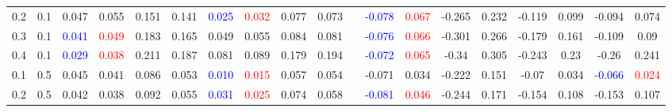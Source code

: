 \documentclass[specialist,
substylefile = spbu_report.rtx,
subf,12pt]{disser}
\theoremstyle{definition}
\begin{document}
\begin{table}
{\begin{tabular}{m{1cm}m{1cm}ccccccccm{0.2cm}cccccccc}
			0.2 & 0.1    & 0.047                                   & 0.055                                      & 0.151                               & 0.141                       & \textcolor{blue}{0.025} & \textcolor{red}{0.032}                  & 0.077                                      & 0.073                    &                             & \textcolor{blue}{-0.078} & \textcolor{red}{0.067} & -0.265                   & 0.232      & -0.119                   & 0.099                   & -0.094                   & 0.074                  \\
			0.3 & 0.1    & \textcolor{blue}{0.041}                 & \textcolor{red}{0.049}                     & 0.183                               & 0.165                       & 0.049                   & 0.055                                   & 0.084                                      & 0.081                    &                             & \textcolor{blue}{-0.076} & \textcolor{red}{0.066} & -0.301                   & 0.266      & -0.179                   & 0.161                   & -0.109                   & 0.09                   \\
			0.4 & 0.1    & \textcolor{blue}{0.029}                 & \textcolor{red}{0.038}                     & 0.211                               & 0.187                       & 0.081                   & 0.089                                   & 0.179                                      & 0.194                    &                             & \textcolor{blue}{-0.072} & \textcolor{red}{0.065} & -0.34                    & 0.305      & -0.243                   & 0.23                    & -0.26                    & 0.241                  \\
			\hline
			0.1 & 0.5    & 0.045                                   & 0.041                                      & 0.086                               & 0.053                       & \textcolor{blue}{0.010} & \textcolor{red}{0.015}                  & 0.057                                      & 0.054                    &                             & -0.071                   & 0.034                  & -0.222                   & 0.151      & -0.07                    & 0.034                   & \textcolor{blue}{-0.066} & \textcolor{red}{0.024} \\
			0.2 & 0.5    & 0.042                                   & 0.038                                      & 0.092                               & 0.055                       & \textcolor{blue}{0.031} & \textcolor{red}{0.025}                  & 0.074                                      & 0.058                    &                             & \textcolor{blue}{-0.081} & \textcolor{red}{0.046} & -0.244                   & 0.171      & -0.154                   & 0.108                   & -0.153                   & 0.107                  \\

\end{tabular}}
\end{table}
\end{document}
